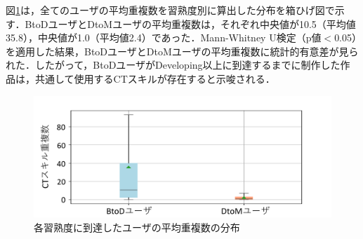 \documentclass[submit]{ipsj}
\begin{document}
図\ref{fig:dupli-mean}は，全てのユーザの\textcolor{red}{}平均重複数を習熟度別に算出した分布を箱ひげ図で示す．BtoDユーザとDtoMユーザの\textcolor{red}{}平均重複数は，それぞれ中央値が10.5（平均値35.8），中央値が1.0（平均値2.4）であった．Mann-Whitney U検定（p値$<$0.05）を適用した結果，BtoDユーザとDtoMユーザの\textcolor{red}{}平均重複数に統計的有意差が見られた．したがって，BtoDユーザがDeveloping以上に到達するまでに制作した作品は，共通して使用するCTスキルが存在すると示唆される．


\begin{figure}[t]
	\centering
	\includegraphics[width=0.8\linewidth]{Okamoto_fig/dupli-all.pdf}
	\caption{各習熟度に到達したユーザの\textcolor{red}{}平均重複数の分布}
	\label{fig:dupli-mean}
 \vspace{-2mm}
\end{figure}
\end{document}
